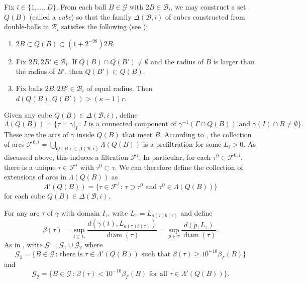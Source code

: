 \documentclass[11pt]{amsart}
\def\diam{{\rm diam\,}}
\theoremstyle{definition}
\def\diam{\operatorname{diam}}
\numberwithin{theorem}{section} \numberwithin{equation}{section}
\begin{document}
Fix $i \in \{1,\dots,D\}$.
From each ball $B \in \mathcal{G}$ with $2B \in \mathcal{B}_i$, 
we may construct a set $Q(B)$ (called a \emph{cube})
so that the family $\Delta(\mathcal{B},i)$ of cubes constructed from double-balls in $\mathcal{B}_i$
satisfies the following (see \cite[Lemma 2.12]{LiSchul}):
\begin{enumerate}
\item $2B \subset Q(B) \subset (1+2^{-98})2B$.
\item Fix $2B,2B' \in \mathcal{B}_i$. If $Q(B) \cap Q(B') \neq \emptyset$ and the radius of $B$ is larger than the radius of $B'$, then $Q(B') \subset Q(B)$.
\item Fix balls $2B,2B' \in \mathcal{B}_i$ of equal radius. Then $d(Q(B),Q(B')) > (\kappa - 1) r$. %
\end{enumerate}
Given any cube $Q(B) \in \Delta(\mathcal{B},i)$, define
$$
\Lambda(Q(B)) = \{ \tau = \gamma|_I \, : \, I \text{ is a connected component of } \gamma^{-1}(\Gamma \cap Q(B)) \text{ and } \gamma(I) \cap B \neq \emptyset \}. 
$$ 
These are the arcs of $\gamma$ inside $Q(B)$ that meet $B$.
According to \cite[Lemma 2.17]{LiSchul},
the collection of arcs $\mathcal{F}^{0,i} = \bigcup_{Q(B) \in \Delta(\mathcal{B},i)} \Lambda(Q(B))$
is a prefiltration for some $L_i >0$.
As discussed above, this induces a filtration $\mathcal{F}^i$.
In particular, for each $\tau^0 \in \mathcal{F}^{0,i}$,
there is a unique $\tau \in \mathcal{F}^{i}$ with $\tau^0 \subset \tau$.
We can therefore define the collection of extensions of arcs in $\Lambda(Q(B))$ as
$$
\Lambda'(Q(B)) = \{ \tau \in \mathcal{F}^{i} \, : \, \tau \supset \tau^0 \text{ and } \tau^0 \in \Lambda(Q(B)) \}
$$
for each cube $Q(B) \in \Delta(\mathcal{B},i)$.

For any arc $\tau$ of $\gamma$ with domain $I_{\tau}$, write $L_{\tau} = L_{a(\tau)b(\tau)}$ and define 
$$
\beta(\tau) 
= \sup_{t \in I_{\tau}} \frac{d(\gamma(t),L_{a(\tau)b(\tau)})}{\diam(\tau)}
= \sup_{p \in \tau} \frac{d(p,L_\tau)}{\diam(\tau)}.
$$
As in \cite{LiSchul}, write $\mathcal{G} = \mathcal{G}_1 \cup \mathcal{G}_2$ where
$$
\mathcal{G}_1 = \{ B \in \mathcal{G} \, : \, \text{there is } \tau \in \Lambda'(Q(B)) \text{ such that } \beta(\tau) \geq 10^{-10} \beta_{\Gamma}(B) \}
$$
and
$$
\mathcal{G}_2 = \{ B \in \mathcal{G} \, : \, \beta(\tau) < 10^{-10} \beta_{\Gamma}(B) \text{ for all } \tau \in \Lambda'(Q(B)) \}.
$$
\end{document}
